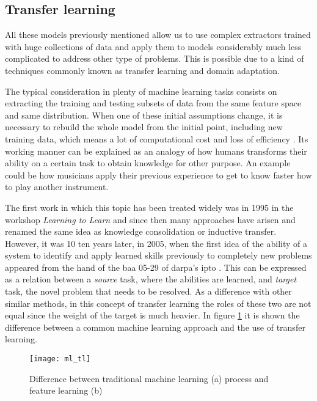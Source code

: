 \subsection{Transfer learning}
\label{subsection:transfer-learning}

	All these models previously mentioned allow us to use complex extractors trained with huge collections of data and apply them to models considerably much less complicated to address other type of problems. This is possible due to a kind of techniques commonly known as transfer learning and domain adaptation.
	
	The typical consideration in plenty of machine learning tasks consists on extracting the training and testing subsets of data from the same feature space and same distribution. When one of these initial assumptions change, it is necessary to rebuild the whole model from the initial point, including new training data, which means a lot of computational cost and loss of efficiency \cite{Pan2010}. Its working manner can be explained as an analogy of how humans transforms their ability on a certain task to obtain knowledge for other purpose. An example could be how musicians apply their previous experience to get to know faster how to play another instrument.
	
	The first work in which this topic has been treated widely was in 1995 in the workshop \textit{Learning to Learn} \cite{Sarkar2018} and since then many approaches have arisen and renamed the same idea as knowledge consolidation or inductive transfer. However, it was 10 ten years later, in 2005, when the first idea of the ability of a system to identify and apply learned skills previously to completely new problems appeared from the hand of the \acrfull{baa} 05-29 of \acrfull{darpa}’s \acrfull{ipto} \cite{Pan2010}. This can be expressed as a relation between a \textit{source} task, where the abilities are learned, and \textit{target} task, the novel problem that needs to be resolved. As a difference with other similar methods, in this concept of transfer learning the roles of these two are not equal since the weight of the target is much heavier. In figure \ref{fig:mesh4} it is shown the difference between a common machine learning approach and the use of transfer learning.
	
	\begin{figure}[h]
		\centering
		\captionsetup{justification=centering}
		\texttt{[image: ml\_tl]}
		\caption{Difference between traditional machine learning (a) process and feature learning (b) \cite{Pan2010}}
		\label{fig:mesh4}
	\end{figure}
	
